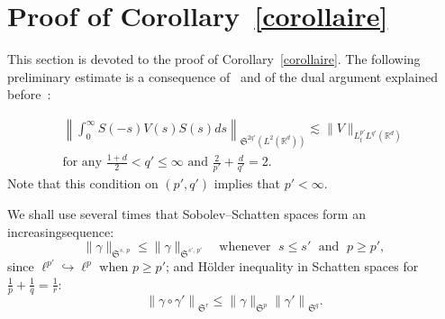 \documentclass[AHL, Unicode, longabstracts,published]{cedram}
\newcommand{\R}{\mathbb{R}}
\newcommand{\frkS}{\mathfrak{S}}
\begin{document}
\section{Proof of Corollary~\ref{corollaire}} \label{sec:coro}

This section is devoted to the proof of Corollary~\ref{corollaire}. The following preliminary estimate is a consequence of~\cite[Theorem~8]{FS} and of the dual argument explained before~\cite[Theorem~2]{FLLS}:

\begin{multline} \label{bd:strichartzpotential}
\left\| \int_0^\infty S(-s)V(s)S(s)ds \right\|_{\frkS^{2q'}\left(L^2\left(\R^d\right)\right)}\lesssim \| V \|_{L^{p'}_tL^{q'}\left(\R^d\right)} \\
\text{for any } \frac{1+d}{2}<q'\leq \infty \text{ and } \frac{2}{p'}+\frac{d}{q'}=2.
\end{multline}
Note that this condition on $(p',q')$ implies that $p'<\infty$.

We shall use several times that Sobolev--Schatten spaces form an increasing\linebreak sequence:
\begin{equation} \label{bd:schattenincreasing}
\| \gamma \|_{\frkS^{s,\,p}}\leq \| \gamma \|_{\frkS^{s',\,p'}} \quad \text{whenever }\; s\leq s' \;\text{ and }\; p\geq p',
\end{equation}
since $\ell ^{p'} \hookrightarrow \ell ^p$ when $p \geq p'$; and H\"older inequality in Schatten spaces for $\tfrac{1}{p}+\tfrac{1}{q}=\tfrac{1}{r}$:
\begin{equation} \label{bd:holderschatten}
\left\| \gamma \circ \gamma' \right\|_{\frkS^{r}}\leq \| \gamma \|_{\frkS^p} \left\| \gamma' \right\|_{\frkS^{q}}.
\end{equation}
\end{document}
